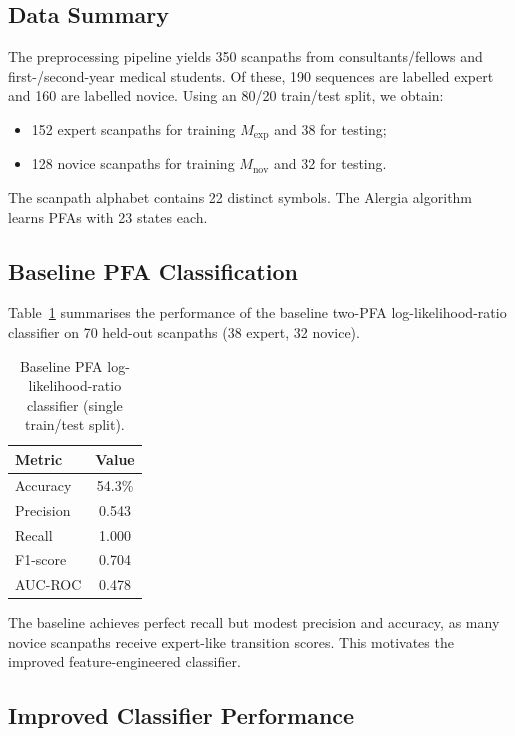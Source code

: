 \documentclass[sigconf]{acmart}
\theoremstyle{plain}
\theoremstyle{definition}
\begin{document}
\subsection{Data Summary}

The preprocessing pipeline yields 350 scanpaths from consultants/fellows and first-/second-year medical students.
Of these, 190 sequences are labelled expert and 160 are labelled novice.
Using an 80/20 train/test split, we obtain:
\begin{itemize}
    \item 152 expert scanpaths for training $M_{\text{exp}}$ and 38 for testing;
    \item 128 novice scanpaths for training $M_{\text{nov}}$ and 32 for testing.
\end{itemize}
The scanpath alphabet contains 22 distinct symbols.
The Alergia algorithm learns PFAs with 23 states each.

\subsection{Baseline PFA Classification}

Table~\ref{tab:baseline} summarises the performance of the baseline two-PFA log-likelihood-ratio classifier on 70 held-out scanpaths (38 expert, 32 novice).

\begin{table}[h]
\centering
\caption{Baseline PFA log-likelihood-ratio classifier (single train/test split).}
\label{tab:baseline}
\begin{tabular}{@{}lc@{}}
\toprule
\textbf{Metric} & \textbf{Value} \\ \midrule
Accuracy  & 54.3\% \\
Precision & 0.543 \\
Recall    & 1.000 \\
F1-score  & 0.704 \\
AUC-ROC   & 0.478 \\ \bottomrule
\end{tabular}
\end{table}

The baseline achieves perfect recall but modest precision and accuracy, as many novice scanpaths receive expert-like transition scores.
This motivates the improved feature-engineered classifier.

\subsection{Improved Classifier Performance}
\end{document}
